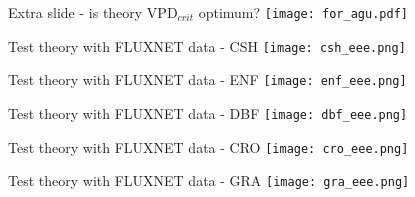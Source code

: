 \documentclass[aspectratio=169]{beamer}
\begin{document}
\begin{frame}{Extra slide - is theory VPD$_{crit}$ optimum?}
  \texttt{[image: for\_agu.pdf]}
\end{frame}

\begin{frame}{Test theory with FLUXNET data - CSH}
  \texttt{[image: csh\_eee.png]}
\end{frame}

\begin{frame}{Test theory with FLUXNET data - ENF}
  \texttt{[image: enf\_eee.png]}
\end{frame}

  
\begin{frame}{Test theory with FLUXNET data - DBF}
  \texttt{[image: dbf\_eee.png]}
\end{frame}

\begin{frame}{Test theory with FLUXNET data - CRO}
  \texttt{[image: cro\_eee.png]}
\end{frame}

\begin{frame}{Test theory with FLUXNET data - GRA}
  \texttt{[image: gra\_eee.png]}
\end{frame}


     




\end{document}
